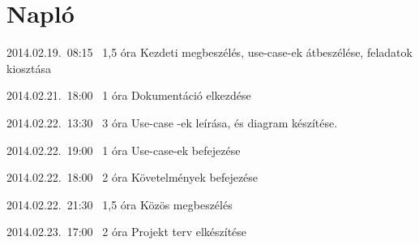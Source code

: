 %
\section{Napló}

\begin{naplo}

\bejegyzes
{2014.02.19.~08:15~}
{1,5 óra}
{\adam\newline
\antal\newline
\bator\newline
\torok}
{Kezdeti megbeszélés, use-case-ek átbeszélése, feladatok kiosztása}

\bejegyzes
{2014.02.21.~18:00~} %
{1 óra} %
{\antal} %
{Dokumentáció elkezdése} %

\bejegyzes
{2014.02.22.~13:30~}
{3 óra}
{\adam}
{Use-case -ek leírása, és diagram készítése.}

\bejegyzes
{2014.02.22.~19:00~}
{1 óra}
{\adam}
{Use-case-ek befejezése}

\bejegyzes
{2014.02.22.~18:00~}
{2 óra}
{\bator}
{Követelmények befejezése}

\bejegyzes
{2014.02.22.~21:30~}
{1,5 óra}
{\adam\newline
\antal\newline
\bator\newline
\torok}
{Közös megbeszélés}

\bejegyzes
{2014.02.23.~17:00~}
{2 óra}
{\bator}
{Projekt terv elkészítése}

\end{naplo}

